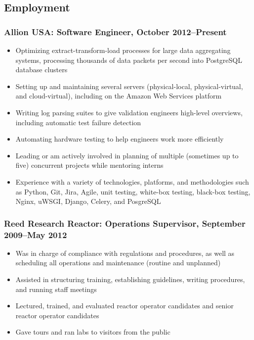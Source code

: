 \documentclass[letterpaper]{article}
\begin{document}
\subsection*{Employment}%


\subsubsection*{Allion USA: \textbf{Software Engineer}, October 2012--Present}
	\begin{itemize}
        \item Optimizing extract-transform-load processes for large data aggregating systems, processing thousands of data packets per second into PostgreSQL database clusters
        \item Setting up and maintaining several servers (physical-local, physical-virtual, and cloud-virtual), including on the Amazon Web Services platform%
        \item Writing log parsing suites to give validation engineers high-level overviews, including automatic test failure detection
        \item Automating hardware testing to help engineers work more efficiently 
        \item Leading or am actively involved in planning of multiple (sometimes up to five) concurrent projects while mentoring interns
        \item Experience with a variety of technologies, platforms, and methodologies such as Python, Git, Jira, Agile, unit testing, white-box testing, black-box testing, Nginx, uWSGI, Django, Celery, and PosgreSQL 
	\end{itemize}
\subsubsection*{Reed Research Reactor: \textbf{Operations Supervisor}, September 2009--May 2012}
	\begin{itemize}
	   \item Was in charge of compliance with regulations and procedures, as well as scheduling all operations and maintenance (routine and unplanned)
	   \item Assisted in structuring training, establishing guidelines, writing procedures, and running staff meetings
	   \item Lectured, trained, and evaluated reactor operator candidates and senior reactor operator candidates
	   \item Gave tours and ran labs to visitors from the public
	\end{itemize}
\end{document}
